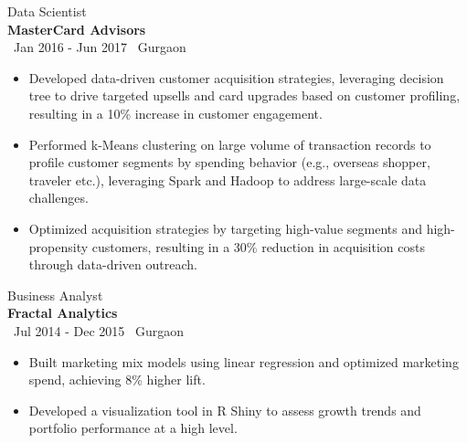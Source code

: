 \documentclass[a4paper,10pt]{article}
\begin{document}
{\large Data Scientist} \\
\textbf{MasterCard Advisors} \\
\faCalendar \, Jan 2016 - Jun 2017 \hfill \faMapMarker \, Gurgaon
\begin{itemize}[itemsep=1pt, topsep=0pt]
    \item Developed data-driven customer acquisition strategies, leveraging decision tree to drive targeted upsells and card upgrades based on customer profiling, resulting in a 10\% increase in customer engagement.
    \item Performed k-Means clustering on large volume of transaction records to profile customer segments by spending behavior (e.g., overseas shopper, traveler etc.), leveraging Spark and Hadoop to address large-scale data challenges.
    \item Optimized acquisition strategies by targeting high-value segments and high-propensity customers, resulting in a 30\% reduction in acquisition costs through data-driven outreach.
\end{itemize}

{\large Business Analyst} \\
\textbf{Fractal Analytics} \\
\faCalendar \, Jul 2014 - Dec 2015 \hfill \faMapMarker \, Gurgaon
\begin{itemize}[itemsep=1pt, topsep=0pt]
    \item Built marketing mix models using linear regression and optimized marketing spend, achieving 8\% higher lift.
    \item Developed a visualization tool in R Shiny to assess growth trends and portfolio performance at a high level.
\end{itemize}
\end{document}
